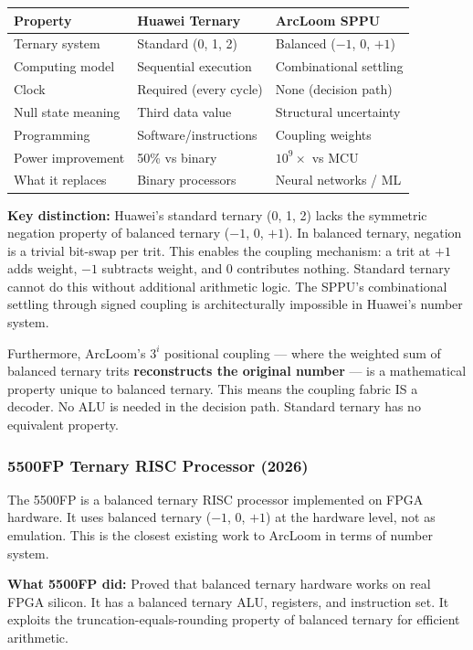 \documentclass[11pt, a4paper]{article}
\begin{document}
\begin{center}
\begin{tabular}{@{}lll@{}}
\toprule
\textbf{Property} & \textbf{Huawei Ternary} & \textbf{ArcLoom SPPU} \\
\midrule
Ternary system & Standard (0, 1, 2) & Balanced ($-1$, 0, $+1$) \\
Computing model & Sequential execution & Combinational settling \\
Clock & Required (every cycle) & None (decision path) \\
Null state meaning & Third data value & Structural uncertainty \\
Programming & Software/instructions & Coupling weights \\
Power improvement & 50\% vs binary & $10^9\times$ vs MCU \\
What it replaces & Binary processors & Neural networks / ML \\
\bottomrule
\end{tabular}
\end{center}

\textbf{Key distinction:} Huawei's standard ternary (0, 1, 2) lacks
the symmetric negation property of balanced ternary ($-1$, 0, $+1$).
In balanced ternary, negation is a trivial bit-swap per trit. This
enables the coupling mechanism: a trit at $+1$ adds weight, $-1$
subtracts weight, and 0 contributes nothing. Standard ternary cannot
do this without additional arithmetic logic. The SPPU's combinational
settling through signed coupling is architecturally impossible in
Huawei's number system.

Furthermore, ArcLoom's $3^i$ positional coupling --- where the
weighted sum of balanced ternary trits \textbf{reconstructs the
original number} --- is a mathematical property unique to balanced
ternary. This means the coupling fabric IS a decoder. No ALU is
needed in the decision path. Standard ternary has no equivalent
property.

\subsubsection{5500FP Ternary RISC Processor (2026)}

The 5500FP is a balanced ternary RISC processor implemented on FPGA
hardware. It uses balanced ternary ($-1$, 0, $+1$) at the hardware
level, not as emulation. This is the closest existing work to
ArcLoom in terms of number system.

\textbf{What 5500FP did:} Proved that balanced ternary hardware
works on real FPGA silicon. It has a balanced ternary ALU, registers,
and instruction set. It exploits the truncation-equals-rounding
property of balanced ternary for efficient arithmetic.
\end{document}
